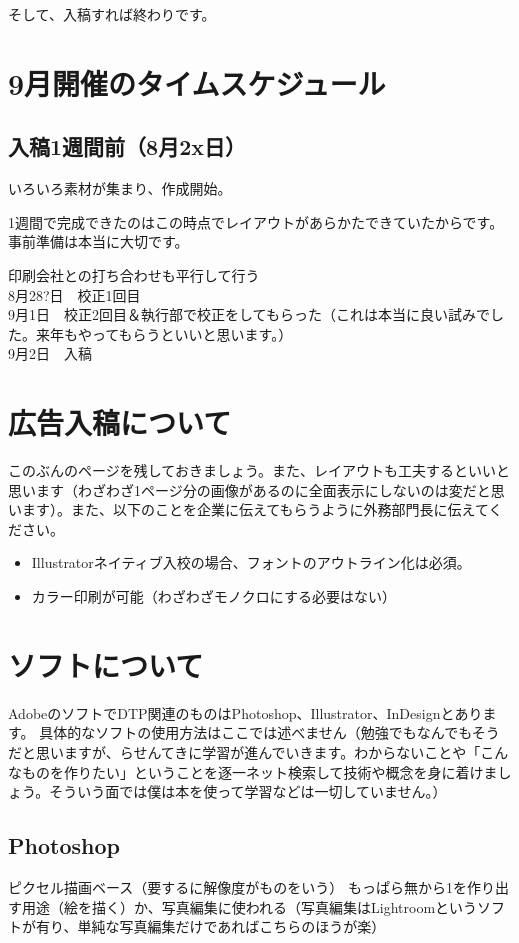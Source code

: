 \documentclass[dvipdfmx,jb5]{jreport}
\begin{document}
そして、入稿すれば終わりです。

\section{9月開催のタイムスケジュール}
\subsection{入稿1週間前（8月2x日）}
いろいろ素材が集まり、作成開始。

1週間で完成できたのはこの時点でレイアウトがあらかたできていたからです。事前準備は本当に大切です。

印刷会社との打ち合わせも平行して行う\\
8月28?日　校正1回目\\
9月1日　校正2回目＆執行部で校正をしてもらった（これは本当に良い試みでした。来年もやってもらうといいと思います。）\\
9月2日　入稿\\

\section{広告入稿について}
このぶんのページを残しておきましょう。また、レイアウトも工夫するといいと思います（わざわざ1ページ分の画像があるのに全面表示にしないのは変だと思います）。また、以下のことを企業に伝えてもらうように外務部門長に伝えてください。
\begin{itemize}
      \item Illustratorネイティブ入校の場合、フォントのアウトライン化は必須。
      \item カラー印刷が可能（わざわざモノクロにする必要はない）
\end{itemize}

\section{ソフトについて}
AdobeのソフトでDTP関連のものはPhotoshop、Illustrator、InDesignとあります。
具体的なソフトの使用方法はここでは述べません（勉強でもなんでもそうだと思いますが、らせんてきに学習が進んでいきます。わからないことや「こんなものを作りたい」ということを逐一ネット検索して技術や概念を身に着けましょう。そういう面では僕は本を使って学習などは一切していません。）

\subsection{Photoshop}
ピクセル描画ベース（要するに解像度がものをいう）
もっぱら無から1を作り出す用途（絵を描く）か、写真編集に使われる（写真編集はLightroomというソフトが有り、単純な写真編集だけであればこちらのほうが楽）
\end{document}
